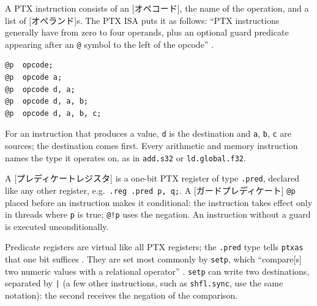 \documentclass[../main.tex]{subfiles}
\begin{document}
A PTX instruction consists of an [オペコード], the name of
the operation, and a list of [オペランド]s.  The PTX ISA
puts it as follows: \enquote{PTX instructions generally have from zero
to four operands, plus an optional guard predicate appearing after an
\texttt{@} symbol to the left of the opcode}
\cite[§9.2]{nvidia2026ptx}.
\begin{lstlisting}[language=PTX, numbers=none]
@p  opcode;
@p  opcode a;
@p  opcode d, a;
@p  opcode d, a, b;
@p  opcode d, a, b, c;
\end{lstlisting}
For an instruction that produces a value, \texttt{d} is the
destination and \texttt{a}, \texttt{b}, \texttt{c} are sources; the
destination comes first.  Every arithmetic and memory
instruction names the type it operates on, as in \texttt{add.s32} or \texttt{ld.global.f32}.

\begin{definition}
  A [プレディケートレジスタ] is a one-bit PTX register
  of type \texttt{.pred}, declared like any other register, e.g.\
  \texttt{.reg .pred p, q;}.  A [ガードプレディケート]
  \texttt{@p} placed before an instruction makes it conditional: the
  instruction takes effect only in threads where \texttt{p} is true;
  \texttt{@!p} uses the negation.  An instruction without a guard is
  executed unconditionally.
\end{definition}

Predicate registers are virtual like all PTX registers; the
\texttt{.pred} type tells \texttt{ptxas} that one bit
suffices \cite[§9.3]{nvidia2026ptx}.  They are set most commonly by \texttt{setp}, which
\enquote{compare[s] two numeric values with a relational operator}
\cite[§9.7.7.2]{nvidia2026ptx}.  \texttt{setp} can write two
destinations, separated by \texttt{|} (a few other instructions, such
as \texttt{shfl.sync}, use the same notation): the second receives the
negation of the comparison.
\end{document}
